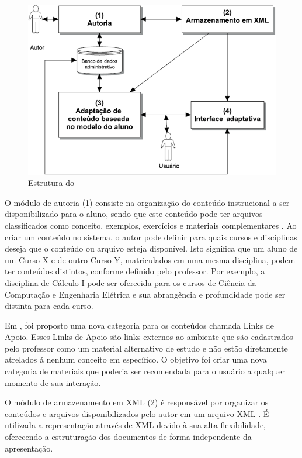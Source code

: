 \begin{figure}[htb]
  \caption{\label{fig:adaptweb-arquitetura}Estrutura do \adaptweb}
  \begin{center}
      \includegraphics[scale=1.0]{./Figuras/adaptweb-arquitetura.png}
  \end{center}
\end{figure}

O módulo de autoria (1) consiste na organização do conteúdo instrucional a ser disponibilizado para o aluno, sendo que
este conteúdo pode ter arquivos classificados como conceito, exemplos, exercícios e materiais complementares
\cite{gasparini2003interface}. Ao criar um conteúdo no sistema, o autor pode definir para quais cursos e disciplinas
deseja que o conteúdo ou arquivo esteja disponível. Isto significa que um aluno de um Curso X e de outro Curso Y,
matriculados em uma mesma disciplina, podem ter conteúdos distintos, conforme definido pelo professor. Por exemplo, a
disciplina de Cálculo I pode ser oferecida para os cursos de Ciência da Computação e Engenharia Elétrica e sua
abrangência e profundidade pode ser distinta para cada curso.

Em , foi proposto uma nova categoria para os conteúdos chamada Links de Apoio. Esses Links de Apoio
são links externos ao ambiente \adaptweb que são cadastrados pelo professor como um
material alternativo de estudo e não estão diretamente atrelados á nenhum conceito em específico. O objetivo foi criar
uma nova categoria de materiais que poderia ser recomendada para o usuário a qualquer momento de sua interação.

O módulo de armazenamento em XML (2) é responsável por organizar os conteúdos e arquivos disponibilizados pelo autor em
um arquivo XML \cite{gasparini2003interface}. É utilizada a representação através de XML devido à sua alta
flexibilidade, oferecendo a estruturação dos documentos de forma independente da apresentação.

